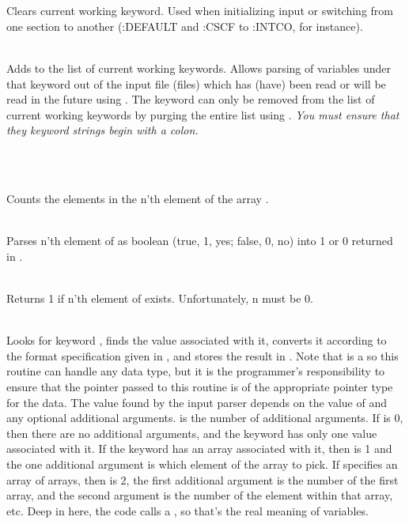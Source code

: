 \begin{center} \\ \end{center}

 \\
Clears current working keyword.  Used when initializing input or switching
from one section to another (:DEFAULT and :CSCF to :INTCO, for instance).

 \\
Adds  to the list of current working keywords.  Allows parsing of 
variables under that keyword out of the input file (files) which has
(have) been read or will be read in the future using .
The keyword  can only be removed from the list of current working
keywords by purging the entire list using . 
{\em You must ensure that they keyword strings begin with a colon.}

\begin{center}  \\ \end{center}

 \\
Counts the elements in the n'th element of the array .

 \\
Parses n'th element of  as boolean (true, 1, yes; false, 0, no)
into 1 or 0 returned in .

 \\
Returns 1 if n'th element of  exists.  Unfortunately, n must be 0.

 \\
Looks for keyword , finds the value associated with it,
converts it according to the format specification given in
, and stores the result in .  Note that
 is a  so this routine can handle any data
type, but it is the programmer's responsibility to ensure that the
pointer passed to this routine is of the appropriate pointer type for
the data.  The value found by the input parser depends on the value of
 and any optional additional arguments.   is the
number of additional arguments.  If  is 0, then there are no
additional arguments, and the keyword has only one value associated
with it.  If the keyword has an array associated with it, then
 is 1 and the one additional argument is which element of the
array to pick.  If  specifies an array of arrays, then
 is 2, the first additional argument is the number of the
first array, and the second argument is the number of the element
within that array, etc.  Deep in here, the code calls a
, so that's the real meaning of
variables.


